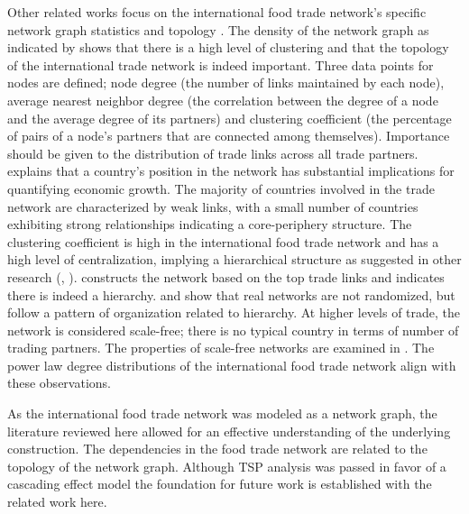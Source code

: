 Other related works focus on the international food trade network's specific network graph statistics \cite{fagiolo2010evolution} and topology \citep{serrano2003topology}. The density of the network graph as indicated by \cite{schiavo2010international} shows that there is a high level of clustering and that the topology of the international trade network is indeed important. Three data points for nodes are defined; node degree (the number of links maintained by each node), average nearest neighbor degree (the correlation between the degree of a node and the average degree of its partners) and clustering coefficient (the percentage of pairs of a node's partners that are connected among themselves). Importance should be given to the distribution of trade links across all trade partners. \cite{kali2007architecture} explains that a country's position in the network has substantial implications for quantifying economic growth. The majority of countries involved in the trade network are characterized by weak links, with a small number of countries exhibiting strong relationships indicating a core-periphery structure. The clustering coefficient is high in the international food trade network and has a high level of centralization, implying a hierarchical structure as suggested in other research (\cite{zhou2016structure}, \cite{garlaschelli2005structure}). \cite{zhou2016structure} constructs the network based on the top trade links and indicates there is indeed a hierarchy. \citep{ravasz2003hierarchical} and \citep{zhou2016structure} show that real networks are not randomized, but follow a pattern of organization related to hierarchy. At higher levels of trade, the network is considered scale-free; there is no typical country in terms of number of trading partners. The properties of scale-free networks are examined in \cite{li2005towards}. The power law degree distributions of the international food trade network align with these observations.\par
As the international food trade network was modeled as a network graph, the literature reviewed here allowed for an effective understanding of the underlying construction. The dependencies in the food trade network are related to the topology of the network graph. Although TSP analysis was passed in favor of a cascading effect model the foundation for future work is established with the related work here.\par



